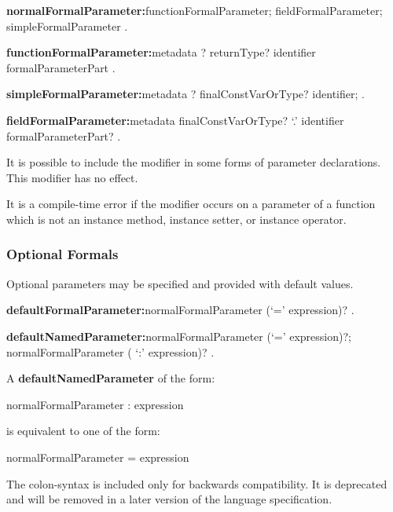 \documentclass{article}
\begin{document}
\begin{grammar}
{\bf normalFormalParameter:}functionFormalParameter;
  fieldFormalParameter;
  simpleFormalParameter
  .

{\bf functionFormalParameter:}metadata \COVARIANT{}? returnType? identifier
  \gnewline{} formalParameterPart
  .

{\bf simpleFormalParameter:}metadata \COVARIANT{}? finalConstVarOrType? identifier;
  .

{\bf fieldFormalParameter:}metadata finalConstVarOrType? \THIS{} `{\escapegrammar .}' identifier
  \gnewline{} formalParameterPart?
  .
\end{grammar}

\LMHash{}
It is possible to include the modifier \COVARIANT{} in some forms of parameter declarations.
This modifier has no effect.


\LMHash{}
It is a compile-time error if the modifier \COVARIANT{} occurs on a parameter of a function which is not an instance method, instance setter, or instance operator.


\subsubsection{Optional Formals}

\LMHash{}
Optional parameters may be specified and provided with default values.

\begin{grammar}
{\bf defaultFormalParameter:}normalFormalParameter (`=' expression)?
  .

{\bf defaultNamedParameter:}normalFormalParameter (`=' expression)?;
  normalFormalParameter ( `{\escapegrammar :}' expression)?
  .
\end{grammar}

A {\bf defaultNamedParameter} of the form:
\begin{code}
   normalFormalParameter : expression
\end{code}
is equivalent to one of the form:
\begin{code}
   normalFormalParameter = expression
\end{code}
The colon-syntax is included only for backwards compatibility.
It is deprecated and will be removed in a later version of the language specification.
\end{document}
